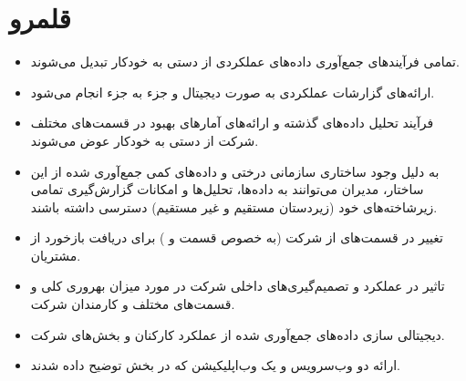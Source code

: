 \section{قلمرو }
\begin{itemize}
\item 
تمامی فرآیند‌های جمع‌آوری داده‌های عملکردی از دستی به خودکار تبدیل می‌شوند.

\item 
ارائه‌های گزارشات عملکردی به صورت دیجیتال و جزء به جزء انجام می‌شود.

\item 
فرآیند تحلیل داده‌های گذشته و ارائه‌های آمار‌های بهبود در قسمت‌های مختلف شرکت از دستی به خودکار عوض می‌شوند.

\item 
به دلیل وجود ساختاری سازمانی درختی و داده‌های کمی جمع‌آوری شده از این ساختار، مدیران می‌توانند به داده‌‌ها،‌ تحلیل‌ها و امکانات گزارش‌گیری تمامی زیر‌شاخته‌های خود (زیردستان مستقیم و غیر مستقیم) دسترسی داشته باشند.

\item 
تغییر در قسمت‌های از شرکت 
(به خصوص قسمت
و 
)
برای دریافت بازخورد از مشتریان.
\item 
تاثیر در عملکرد و تصمیم‌گیری‌های داخلی شرکت در مورد میزان بهروری کلی و قسمت‌های مختلف و کارمندان شرکت.

\item 
دیجیتالی سازی داده‌های جمع‌آوری شده از عملکرد کارکنان و بخش‌های شرکت.

\item 
ارائه دو وب‌سرویس و یک وب‌اپلیکیشن که در بخش
توضیح داده شدند.
\end{itemize}
